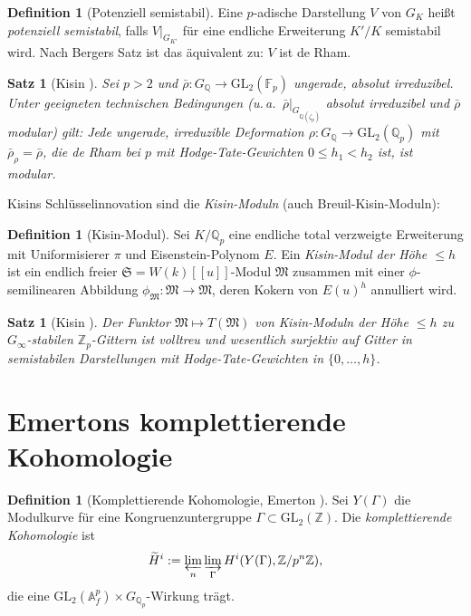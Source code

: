 \documentclass[12pt,a4paper]{amsart}
\newtheorem{satz}[theorem]{Satz}
\theoremstyle{definition}
\newtheorem{definition_de}[theorem]{Definition}
\theoremstyle{remark}
\newcommand{\GL}{\mathrm{GL}}
\newcommand{\Qp}{\mathbb{Q}_p}
\newcommand{\Zp}{\mathbb{Z}_p}
\newcommand{\GQ}{G_{\mathbb{Q}}}
\newcommand{\Z}{\mathbb{Z}}
\newcommand{\Q}{\mathbb{Q}}
\newcommand{\F}{\mathbb{F}}
\begin{document}
\begin{definition_de}[Potenziell semistabil]
  Eine $p$-adische Darstellung $V$ von $G_K$ heißt \emph{potenziell semistabil}, falls
  $V|_{G_{K'}}$ für eine endliche Erweiterung $K'/K$ semistabil wird.
  Nach Bergers Satz ist das äquivalent zu: $V$ ist de Rham.
\end{definition_de}

\begin{satz}[Kisin \cite{Kisin2009}]\label{satz:kisin}
  Sei $p > 2$ und $\bar{\rho}\colon \GQ \to \GL_2(\F_p)$ ungerade, absolut irreduzibel.
  Unter geeigneten technischen Bedingungen (u.\,a.\ $\bar{\rho}|_{G_{\Q(\zeta_p)}}$
  absolut irreduzibel und $\bar{\rho}$ modular) gilt:
  Jede ungerade, irreduzible Deformation $\rho\colon \GQ \to \GL_2(\Qp)$ mit
  $\bar{\rho}_\rho = \bar{\rho}$, die de Rham bei $p$ mit
  Hodge-Tate-Gewichten $0 \leq h_1 < h_2$ ist, ist modular.
\end{satz}

Kisins Schlüsselinnovation sind die \emph{Kisin-Moduln} (auch Breuil-Kisin-Moduln):

\begin{definition_de}[Kisin-Modul]
  Sei $K/\Qp$ eine endliche total verzweigte Erweiterung mit Uniformisierer $\pi$ und
  Eisenstein-Polynom $E$. Ein \emph{Kisin-Modul der Höhe $\leq h$} ist ein endlich
  freier $\mathfrak{S} = W(k)[[u]]$-Modul $\mathfrak{M}$ zusammen mit einer
  $\phi$-semilinearen Abbildung $\phi_\mathfrak{M}\colon \mathfrak{M} \to \mathfrak{M}$,
  deren Kokern von $E(u)^h$ annulliert wird.
\end{definition_de}

\begin{satz}[Kisin \cite{Kisin2006}]
  Der Funktor $\mathfrak{M} \mapsto T(\mathfrak{M})$ von Kisin-Moduln der Höhe $\leq h$
  zu $G_\infty$-stabilen $\Zp$-Gittern ist volltreu und wesentlich surjektiv auf
  Gitter in semistabilen Darstellungen mit Hodge-Tate-Gewichten in $\{0,\ldots,h\}$.
\end{satz}

\section{Emertons komplettierende Kohomologie}\label{sec:emerton}

\begin{definition_de}[Komplettierende Kohomologie, Emerton \cite{Emerton2006}]
  Sei $Y(\Gamma)$ die Modulkurve für eine Kongruenzuntergruppe
  $\Gamma \subset \GL_2(\Z)$.
  Die \emph{komplettierende Kohomologie} ist
  \[
    \widetilde{H}^i := \varprojlim_n \varinjlim_\Gamma H^i(Y(\Gamma), \Z/p^n\Z),
  \]
  die eine $\GL_2(\mathbb{A}_f^p) \times G_{\Qp}$-Wirkung trägt.
\end{definition_de}
\end{document}
